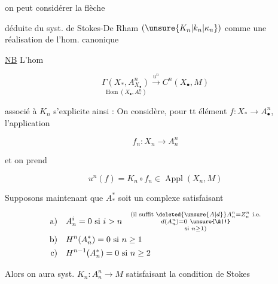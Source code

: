 
on peut considérer la flèche


déduite du syst. de Stokes-De Rham $(\unsure{K_n|k_n|\kappa_n})$ comme une réalisation de l'hom. canonique


 

\uline{NB} L'hom

\[
\underset{\operatorname{Hom}(X_\bullet,A^n_*)}{\Gamma(X_*,A^n_{X_\bullet})}\xrightarrow{u^n} C^n(X_\bullet,M)
\]

associé à $K_n$ s'explicite ainsi : On considère, pour tt élément  $f:X_*\longrightarrow A^n_\bullet$, l'application

\[
f_n:X_n\longrightarrow A^n_n
\]

et on prend

\[
u^n(f)=K_n\circ f_n\in\operatorname{Appl}(X_n,M)
\]

Supposons maintenant que $A_*^*$ soit un complexe satisfaisant

\[
\begin{aligned}
\text{a)}\quad &A^i_n=0\text{ si }i>n
\quad\substack{\text{(il suffit }\deleted{\unsure{A|d}}A^n_n=Z^n_n\text{ i.e.}\\d(A^n_n)=0\ \unsure{\&|!}\\\text{si }n\geq1\text{)}}\\
\text{b)}\quad &H^n(A^*_n)=0\text{ si }n\geq 1\\
\text{c)}\quad &H^{n-1}(A^*_n)=0\text{ si }n\geq 2
\end{aligned}
\]

Alors on aura  syst. $K_n:A_n^n\longrightarrow M$ satisfaisant la condition de Stokes

